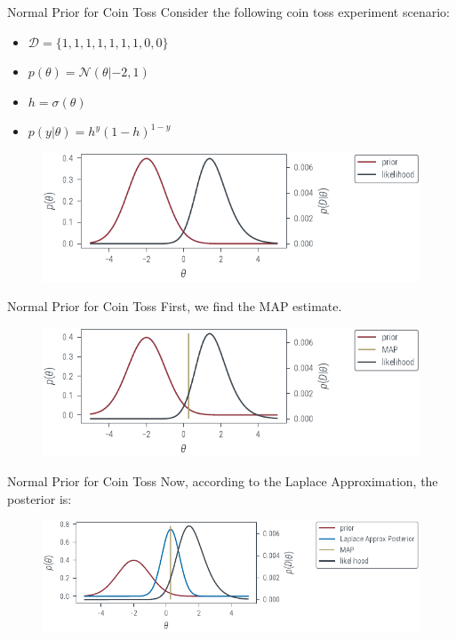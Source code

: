 \documentclass{beamer}
\begin{document}
\begin{frame}{Normal Prior for Coin Toss}
    Consider the following coin toss experiment scenario:
    \begin{itemize}
        \item $\mathcal{D} = \{1, 1, 1, 1, 1, 1, 1, 0, 0\}$
        \item $p(\theta) = \mathcal{N}(\theta|-2, 1)$
        \item $h = \sigma(\theta)$
        \item $p(y|\theta) = h^y(1-h)^{1-y}$
    \end{itemize}
    \begin{figure}
        \includegraphics[]{../figures/laplace-approx/normal-prior-coin-toss.pdf}
    \end{figure}
\end{frame}

\begin{frame}{Normal Prior for Coin Toss}
    First, we find the MAP estimate.
    \begin{figure}
        \includegraphics[]{../figures/laplace-approx/normal-prior-coin-toss-map.pdf}
    \end{figure}
\end{frame}

\begin{frame}{Normal Prior for Coin Toss}
    Now, according to the Laplace Approximation, the posterior is:
    \begin{figure}
        \includegraphics[]{../figures/laplace-approx/normal-prior-coin-toss-laplace.pdf}
    \end{figure}
\end{frame}
\end{document}
